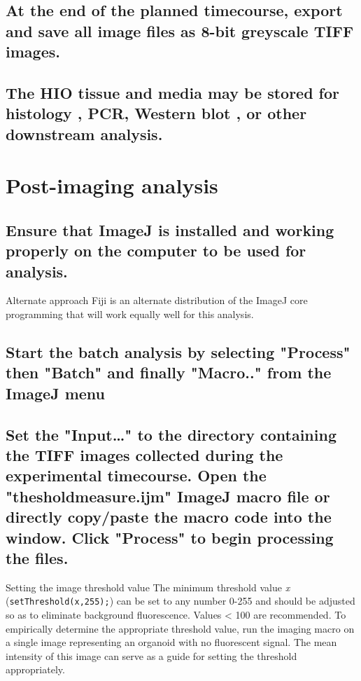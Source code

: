 \documentclass[11pt]{article}
\begin{document}
\subsection{{\sffamily } At the end of the planned timecourse, export and save all image files as 8-bit greyscale TIFF images.}
\label{sec:orgheadline66}
\subsection{{\sffamily } The HIO tissue and media may be stored for histology \supercite{bancroft2008theory}, PCR\supercite{kennedy2011pcr}, Western blot \supercite{kurien2015western}, or other downstream analysis.}
\label{sec:orgheadline67}

\section{{\sffamily } Post-imaging analysis}
\label{sec:orgheadline74}
\subsection{{\sffamily } Ensure that ImageJ \supercite{Schneider:2012} is installed and working properly on the computer to be used for analysis.}
\label{sec:orgheadline69}

\begin{bclogo}[logo=\bcinfo, couleurBarre=Black, noborder=true, couleur=gray!10]{     Alternate approach}
Fiji \supercite{Schindelin:2012} is an alternate distribution of the ImageJ core programming that will work equally well for this analysis.\\
\end{bclogo}

\subsection{{\sffamily } Start the batch analysis by selecting "Process" then "Batch" and finally "Macro.." from the ImageJ menu}
\label{sec:orgheadline70}
\subsection{{\sffamily } Set the "Input\ldots{}" to the directory containing the TIFF images collected during the experimental timecourse. Open the "thesholdmeasure.ijm" ImageJ macro file or directly copy/paste the macro code into the window. Click "Process" to begin processing the files.}
\label{sec:orgheadline71}
\begin{bclogo}[logo=\bcinfo, couleurBarre=Black, noborder=true, couleur=gray!10]{     Setting the image threshold value}
The minimum threshold value \emph{x} (\texttt{setThreshold(x,255);}) can be set to any number 0-255 and should be adjusted so as to eliminate background fluorescence. Values < 100 are recommended. To empirically determine the appropriate threshold value, run the imaging macro on a single image representing an organoid with no fluorescent signal. The mean intensity of this image can serve as a guide for setting the threshold appropriately.\\
\end{bclogo}
\end{document}
